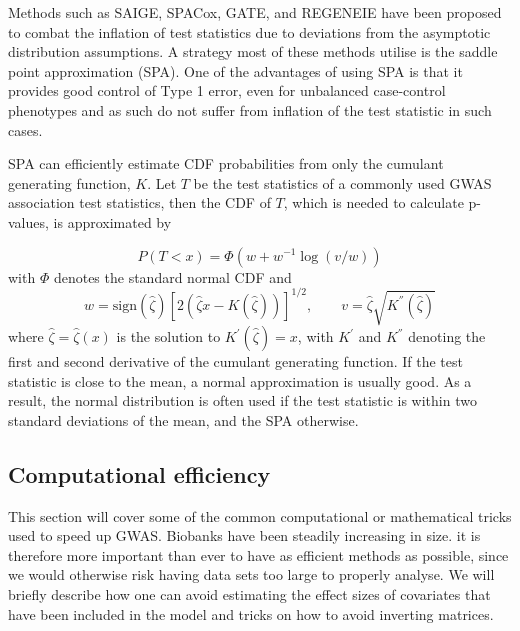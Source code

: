 Methods such as SAIGE\cite{zhou2018efficiently}, SPACox\cite{bi2020fast}, GATE\cite{dey2022efficient}, and REGENEIE\cite{mbatchou2021computationally} have been proposed to combat the inflation of test statistics due to deviations from the asymptotic distribution assumptions. A strategy most of these methods utilise is the saddle point approximation (SPA)\cite{daniels1954saddlepoint,kuonen1999miscellanea}. One of the advantages of using SPA is that it provides good control of Type 1 error, even for unbalanced case-control phenotypes and as such do not suffer from inflation of the test statistic in such cases\cite{mbatchou2021computationally}.

SPA can efficiently estimate CDF probabilities from only the cumulant generating function, $ K $. Let $ T $ be the test statistics of a commonly used GWAS association test statistics, then the CDF of $ T $, which is needed to calculate p-values, is approximated by

\begin{equation}
P(T < x) = \Phi\left( w + w^{-1} \log(v/w)\right)
\end{equation}
with $ \Phi $ denotes the standard normal CDF and
\begin{equation}
w = \text{sign}(\hat{\zeta})\left[2\left(\hat{\zeta} x - K(\hat{\zeta})\right) \right]^{1/2},
 \qquad 
v = \hat{\zeta}\sqrt{K^{''}(\hat{\zeta})}
\end{equation}
where $ \hat{\zeta} = \hat{\zeta}(x) $ is the solution to $ K^{'}(\hat{\zeta}) = x $, with $ K^{'} $ and $ K^{''} $ denoting the first and second derivative of the cumulant generating function. If the test statistic is close to the mean, a normal approximation is usually good. As a result, the normal distribution is often used if the test statistic is within two standard deviations of the mean, and the SPA otherwise.



\subsection{Computational efficiency} \label{sec:computationalEfficiency}
This section will cover some of the common computational or mathematical tricks used to speed up GWAS. Biobanks have been steadily increasing in size. it is therefore more important than ever to have as efficient methods as possible, since we would otherwise risk having data sets too large to properly analyse. We will briefly describe how one can avoid estimating the effect sizes of covariates that have been included in the model and tricks on how to avoid inverting matrices. 



